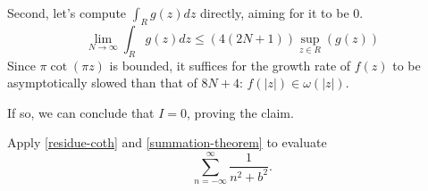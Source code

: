 \documentclass{homework}
\begin{document}
\begin{solution}
                                                                                                                                                                                              Second, let's compute $\int_R g(z)dz$ directly, aiming for it to be 0.
                                                                                                                                                                                              \[
                                                                                                                                                                                              \lim_{N\to\infty} \int_R g(z) dz \leq (4(2N+1))\sup_{z\in R}(g(z))
                                                                                                                                                                                              \]
                                                                                                                                                                                              Since $\pi\cot(\pi z)$ is bounded, it suffices for the growth rate of $f(z)$ to be asymptotically slowed than that of $8N+4$: $f(|z|) \in \omega(|z|)$.

                                                                                                                                                                                              If so, we can conclude that $I=0$, proving the claim.
                                                                                                                                                                                              \end{solution}
                                                                                                                                                                                              \begin{problem}
                                                                                                                                                                                                Apply \ref{residue-coth} and \ref{summation-theorem} to evaluate
                                                                                                                                                                                                  \[
                                                                                                                                                                                                      \sum_{n=-\infty}^\infty \frac{1}{n^2 + b^2}.
                                                                                                                                                                                                        \]
                                                                                                                                                                                                        \end{problem}
\end{document}
